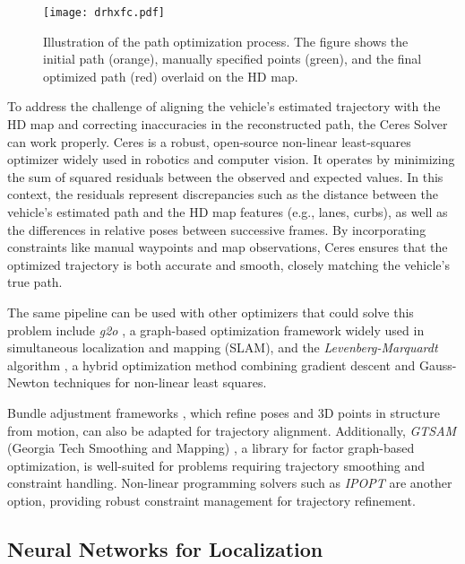 \begin{figure}[H]
    \centering
    \texttt{[image: drhxfc.pdf]}
    \caption{Illustration of the path optimization process. The figure shows the initial path (orange), manually specified points (green), and the final optimized path (red) overlaid on the HD map.}
    \label{fig:optimizer}
\end{figure}

To address the challenge of aligning the vehicle's estimated trajectory with the HD map and correcting inaccuracies in the reconstructed path, the Ceres Solver \cite{Agarwal_Ceres_Solver_2022} can work properly. Ceres is a robust, open-source non-linear least-squares optimizer widely used in robotics and computer vision. It operates by minimizing the sum of squared residuals between the observed and expected values. In this context, the residuals represent discrepancies such as the distance between the vehicle's estimated path and the HD map features (e.g., lanes, curbs), as well as the differences in relative poses between successive frames. By incorporating constraints like manual waypoints and map observations, Ceres ensures that the optimized trajectory is both accurate and smooth, closely matching the vehicle's true path. 

The same pipeline can be used with other optimizers that could solve this problem include \textit{g2o} \cite{Kummerle_g2o_2011}, a graph-based optimization framework widely used in simultaneous localization and mapping (SLAM), and the \textit{Levenberg-Marquardt} algorithm \cite{Levenberg_LMA_1944, Marquardt_LMA_1963}, a hybrid optimization method combining gradient descent and Gauss-Newton techniques for non-linear least squares. 

Bundle adjustment frameworks \cite{Triggs_BA_1999}, which refine poses and 3D points in structure from motion, can also be adapted for trajectory alignment. Additionally, \textit{GTSAM} (Georgia Tech Smoothing and Mapping) \cite{Dellaert_GTSAM_2012}, a library for factor graph-based optimization, is well-suited for problems requiring trajectory smoothing and constraint handling. Non-linear programming solvers such as \textit{IPOPT} \cite{Wachter_IPOPT_2006} are another option, providing robust constraint management for trajectory refinement. 

\subsection*{Neural Networks for Localization}


